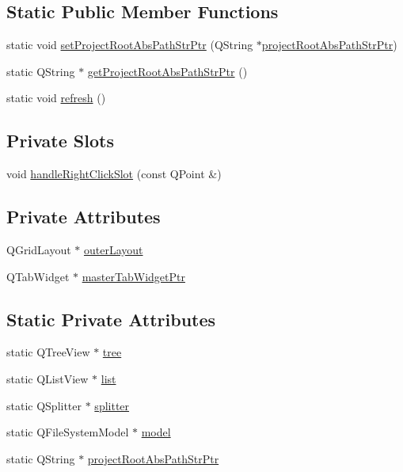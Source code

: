 \subsection*{Static Public Member Functions}
\begin{DoxyCompactItemize}
\item 
static void \hyperlink{class_file_tree_gui_afe882583424429fcda9c4c2bc0ab71d4}{set\-Project\-Root\-Abs\-Path\-Str\-Ptr} (Q\-String $\ast$\hyperlink{class_file_tree_gui_a9ce991f8f95f583aa5fb1bec7a9bcd4c}{project\-Root\-Abs\-Path\-Str\-Ptr})
\item 
static Q\-String $\ast$ \hyperlink{class_file_tree_gui_a21607e8cda6732997d5148581017a9b8}{get\-Project\-Root\-Abs\-Path\-Str\-Ptr} ()
\item 
static void \hyperlink{class_file_tree_gui_ac2c3399b5cb85da5cd1c119b61c674c0}{refresh} ()
\end{DoxyCompactItemize}
\subsection*{Private Slots}
\begin{DoxyCompactItemize}
\item 
void \hyperlink{class_file_tree_gui_a9d726b5258284de8f9dc10cddddbdc87}{handle\-Right\-Click\-Slot} (const Q\-Point \&)
\end{DoxyCompactItemize}
\subsection*{Private Attributes}
\begin{DoxyCompactItemize}
\item 
Q\-Grid\-Layout $\ast$ \hyperlink{class_file_tree_gui_aaf8b63a4775b1d46d635cdaef94b979a}{outer\-Layout}
\item 
Q\-Tab\-Widget $\ast$ \hyperlink{class_file_tree_gui_adb1e3ecfaab582317fcd9b968bbf6c40}{master\-Tab\-Widget\-Ptr}
\end{DoxyCompactItemize}
\subsection*{Static Private Attributes}
\begin{DoxyCompactItemize}
\item 
static Q\-Tree\-View $\ast$ \hyperlink{class_file_tree_gui_a157ed39f1e9a52c664d5372c65878f58}{tree}
\item 
static Q\-List\-View $\ast$ \hyperlink{class_file_tree_gui_af6806c8bd5ed67e2ee8400df58605985}{list}
\item 
static Q\-Splitter $\ast$ \hyperlink{class_file_tree_gui_a43e8677ba8c50059d003f298b631e131}{splitter}
\item 
static Q\-File\-System\-Model $\ast$ \hyperlink{class_file_tree_gui_acc9d4c548eaf49500759a8b677b3e60f}{model}
\item 
static Q\-String $\ast$ \hyperlink{class_file_tree_gui_a9ce991f8f95f583aa5fb1bec7a9bcd4c}{project\-Root\-Abs\-Path\-Str\-Ptr}
\end{DoxyCompactItemize}


